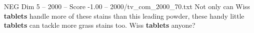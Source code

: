 \begin{textsample}{NEG Dim 5 – 2000 – Score -1.00 – 2000/tv\_com\_2000\_70.txt}  \label{ex:f5_neg_039}
Not only can Wiss \textbf{tablets} handle more of these stains than this leading powder, these handy little \textbf{tablets} can tackle more grass stains too.
Wiss \textbf{tablets} anyone?

\end{textsample}
